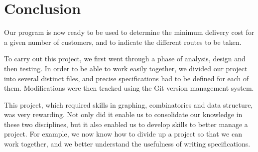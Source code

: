 \chapter*{Conclusion}

Our program is now ready to be used to determine the minimum delivery cost for a given number of customers, and to indicate the different routes to be taken.

To carry out this project, we first went through a phase of analysis, design and then testing. In order to be able to work easily together, we divided our project into several distinct files, and precise specifications had to be defined for each of them. Modifications were then tracked using the Git version management system.

This project, which required skills in graphing, combinatorics and data structure, was very rewarding. Not only did it enable us to consolidate our knowledge in these two disciplines, but it also enabled us to develop skills to better manage a project. For example, we now know how to divide up a project so that we can work together, and we better understand the usefulness of writing specifications.
